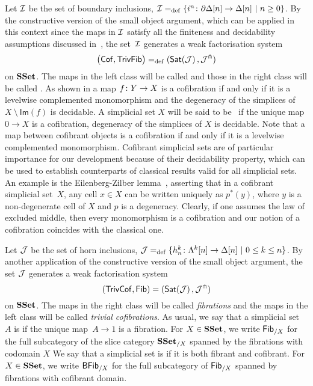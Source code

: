 \documentclass[reqno,10pt,a4paper,oneside,draft]{amsart}
\begin{document}
Let $\cal{I}$ be the set of boundary inclusions, \ie $\cal{I} \defeq \{ i^n \co  \partial \Delta[n] \to \Delta[n] \ | \ n \geq 0 \}$.  By the constructive version of the small object argument, which can be applied in this context since the 
maps in $\cal{I}$ satisfy all the finiteness and decidability assumptions discussed  in~\cite[\S 4.1.4]{henry2018wms}, the set~$\cal{I}$ generates a weak factorisation system
\[
\big( \Cof, \TrivFib \big) \defeq ( \mathsf{Sat}(\cal{J}) \, , \cal{J}^\pitchfork)
\]
on $\SSet$. The maps in the left class will be called  and those in the right
class will be called . 
As shown in \cite{henry2018wms} a map $f \co Y \to X$ is a cofibration if  and only if 
it is a levelwise complemented monomorphism and the degeneracy of the simplices of $X~\setminus~\mathsf{Im}(f)$ is decidable. A simplicial set $X$ will be said to be~ if the unique map $0 \to X$ is a cofibration, 
\ie degeneracy of the simplices of $X$ is decidable.
Note that a map between cofibrant objects is a cofibration
if and only if it is a levelwise complemented monomorphism. 
Cofibrant simplicial sets are of particular importance for our development because of their decidability property, which can be used to establish counterparts of classical results valid for all simplicial sets. An example is the Eilenberg-Zilber lemma~\cite{henry2018wms}, asserting that in a cofibrant simplicial set~$X$, any cell $x \in X$ can be written uniquely as $p^*(y)$, where $y$ is a non-degenerate cell of $X$ and $p$ is a degeneracy. Clearly, if one assumes the law of excluded middle, then every monomorphism is a cofibration and our notion of a cofibration coincides with the classical one. 

\medskip

Let $\cal{J}$ be the set of horn inclusions, \ie $\cal{J} \defeq \{ h^k_n  \co \Lambda^k[n] \to \Delta[n]  \ | \ 0 \leq k \leq n \}$. By another application of the constructive version of the small object argument, the set $\cal{J}$
generates a weak factorisation system 
\[
(\TrivCof, \Fib) = ( \mathsf{Sat}(\cal{J}) \, , \cal{J}^\pitchfork)
\] 
on $\SSet$. The maps in the right class will be called \emph{fibrations} and the maps in the left class will be called \emph{trivial cofibrations}. As usual, we say that a simplicial set~$A$ is  if  \ie the unique map~$A \to 1$ is a fibration. For $X \in \SSet$, we write $\Fib_{/X}$ for the full subcategory of the slice category $\SSet_{/X}$ spanned by the fibrations with codomain $X$
We say that a simplicial set is  if it is both fibrant and cofibrant.  For $X \in \SSet$,
we write $\BFFib_{/X}$ for  the full subcategory of  $\Fib_{/X}$ spanned by fibrations with cofibrant domain.
\end{document}

